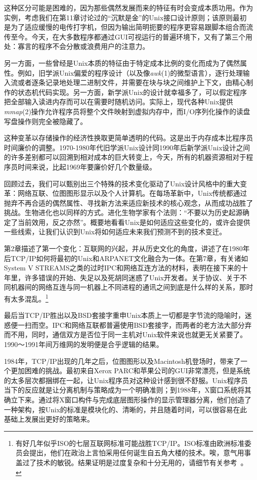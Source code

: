 \documentclass[12pt,oneside]{ctexbook}
\begin{document}
\begin{common-format}
这种区分可能是困难的，因为那些偶然发展而来的特征有时会变成本质功用。作为实例，考虑我们在第11章讨论过的“沉默是金”的Unix接口设计原则；该原则最初是为了适应缓慢的电传打字机，但因为输出简明扼要的程序更容易跟脚本组合而流传至今。今天，在大多数程序都通过GUI可视运行的普遍环境下，又有了第三个用处：寡言的程序不会分散或浪费用户的注意力。

另一方面，一些曾经是Unix本质的特征由于特定成本比例的变化而成为了偶然属性。例如，旧学派Unix偏爱的程序设计（以及像\textit{awk}(1)的微型语言），逐行处理输入流或者逐条记录地处理二进制文件，并需要在块与块之间维护上下文，由精心制作的状态机代码实现。另一方面，新学派Unix的设计就幸福多了，可以假定程序把全部输入读进内存而可以在需要时随机访问。实际上，现代各种Unix提供\textit{mmap}(2)操作允许程序员将整个文件映射到虚拟内存中，而I/O序列化操作的读盘写盘操作则完全被隐藏了。

这种变革以存储操作的经济性换取更简单透明的代码。这是出于内存成本比程序员时间廉价的调整。1970-1980年代旧学派Unix设计同1990年后新学派Unix设计之间的许多差别都可以回溯到相对成本的巨大转变上，今天，所有的机器资源相对于程序员时间来说，比起1969年要廉价好几个数量级。

回顾过去，我们可以甄别出三个特殊的技术变化驱动了Unix设计风格中的重大变革：网络互联、位图图形显示以及个人计算机。在每场革新中，Unix传统都通过抛弃不再合适的偶然属性、寻找新方法来适应新技术的核心观念，从而成功战胜了挑战。生物进化也以同样的方式。进化生物学家有个法则：“不要以为历史起源确定了当前效用，反之亦然”。概要地看看Unix是如何适应这些变化的，或许会提供一些线索，让我们认识到Unix将如何适应未来我们预测不到的技术变迁。

第2章描述了第一个变化：互联网的兴起，并从历史文化的角度，讲述了在1980年后TCP/IP如何将最初的Unix和ARPANET文化融合为一体。在第7章，有关诸如System V STREAMS之类的过时IPC和网络互连方法的材料，表明在接下来的十年里，许多错误的开始、失足以及死胡同迷惑了Unix开发者。关于协议、关于不同机器间的网络互连与同一机器上不同进程的通讯之间到底是什么样的关系，那时有太多混乱。\footnote{有好几年似乎ISO的七层互联网标准可能战胜TCP/IP。ISO标准由欧洲标准委员会提出，他们在政治上言怕采用任何诞生自五角大楼的技术。唉，意气用事盖过了技术的敏锐。结果证明是过度复杂和十分无用的，请细节有关参考~\cite{Padlipsky}。}

最后当TCP/IP胜出以及BSD套接字重申Unix本质上一切都是字节流的隐喻时，迷惑便一扫而空。IPC和网络互联都普遍使用BSD套接字，而两者的老方法大部分弃而不用，同时，通信双方是否位于同一主机对Unix软件来说也就更无关紧要了。1990～1991年间万维网的发明便是合乎逻辑的结果。

1984年，TCP/IP出现的几年之后，位图图形以及Macintosh机登场时，带来了一个更加困难的挑战。最初来自Xerox PARC和苹果公司的GUI非常漂亮，但是系统的太多层次都捆绑在一起，让Unix程序员对这种设计感到很不舒服。Unix程序员当下的反应就是让分离机制与策略成为一个明确准则；到1988年，X窗口系统将其确立下来。通过将X窗口构件与完成底层图形操作的显示管理器分离，他们创造了一种架构，按Unix的标准是模块化的、清晰的，并且随着时间，可以很容易在此基础上发展出更好的策略来。


\end{common-format}
\end{document}
